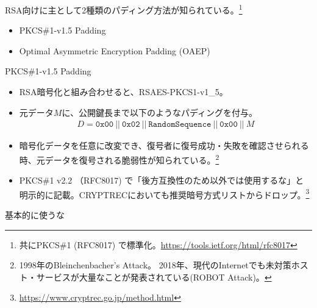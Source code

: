 \documentclass[12pt,dvipdfmx]{beamer}
\begin{document}
\begin{frame}

RSA向けに主として2種類のパディング方法が知られている。\footnote[frame]{\scriptsize 共にPKCS\#1 (RFC8017) で標準化。\url{https://tools.ietf.org/html/rfc8017}}

\begin{itemize}
 \item PKCS\#1-v1.5 Padding
 \item Optimal Asymmetric Encryption Padding (OAEP)
\end{itemize}

\end{frame}


\begin{frame}

\begin{block}{\small PKCS\#1-v1.5 Padding}
\small
\begin{itemize}
 \item RSA暗号化と組み合わせると、RSAES-PKCS1-v1\_5。
 \item 元データ$M$に、公開鍵長まで以下のようなパディングを付与。
\begin{align*}
 D = \mathtt{0x00}\ ||\ \mathtt{0x02}\ ||\ \texttt{RandomSequence}\ ||\ \mathtt{0x00}\ ||\ M
\end{align*}
 \item 暗号化データを任意に改変でき、復号者に復号成功・失敗を確認させられる時、\alert{元データを復号される脆弱性}が知られている。\footnote[frame]{\scriptsize 1998年のBleinchenbacher's Attack。 2018年、現代のInternetでも未対策ホスト・サービスが大量なことが発表されている(ROBOT Attack)。}
 \item PKCS\#1 v2.2 （RFC8017) で「後方互換性のため以外では使用するな」と明示的に記載。CRYPTRECにおいても推奨暗号方式リストからドロップ。\footnote[frame]{\scriptsize \url{https://www.cryptrec.go.jp/method.html}}
\end{itemize}
\end{block}

\begin{center}
 {\Large \alert{基本的に使うな}}
\end{center}
\end{frame}
\end{document}

